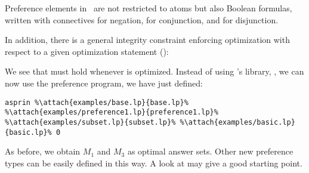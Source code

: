 \begin{note}
Preference elements in \asprin\ are not restricted to atoms 
but also Boolean formulas, written with connectives 
\code{\~} for negation, 
\code{\&} for conjunction,
and 
\code{|} for disjunction.
\eexample
\end{note}

In addition, 
there is a general integrity constraint enforcing optimization with respect to a given optimization statement
():
%

%
We see that  must hold whenever  is optimized. 
Instead of using \asprin's library, , 
we can now use the preference program, we have just defined:
\begin{lstlisting}[numbers=none,escapechar=\%]
asprin %\attach{examples/base.lp}{base.lp}% %\attach{examples/preference1.lp}{preference1.lp}% %\attach{examples/subset.lp}{subset.lp}% %\attach{examples/basic.lp}{basic.lp}% 0
\end{lstlisting}
As before, we obtain $M_1$ and $M_3$ as optimal answer sets.
Other new preference types can be easily defined in this way.  
A look at  may give a good starting point. 

